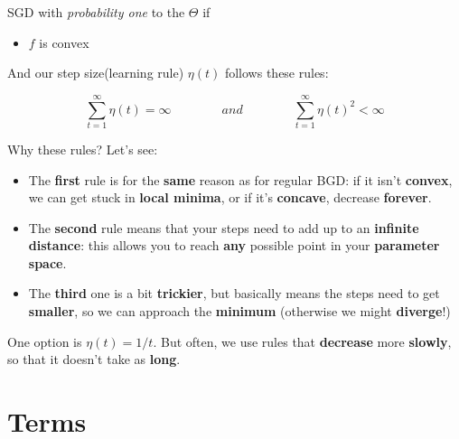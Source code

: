         \begin{theorem}
            SGD  with \textit{probability one} to the  $\Theta$ if
            
            \begin{itemize}
                \item $f$ is convex
            \end{itemize}
            
            And our step size(learning rule) $\eta(t)$ follows these rules:
            
            \begin{equation*}
                \sum_{t=1}^{\infty} \eta(t) = \infty
                \qquad \qquad
                and
                \qquad \qquad
                \sum_{t=1}^{\infty} \eta(t)^2 < \infty
            \end{equation*}
        \end{theorem}
        
        Why these rules? Let's see:
        
        \begin{itemize}
            \item The \textbf{first} rule is for the \textbf{same} reason as for regular BGD: if it isn't \textbf{convex}, we can get stuck in \textbf{local minima}, or if it's \textbf{concave}, decrease \textbf{forever}.
            
            \item The \textbf{second} rule means that your steps need to add up to an \textbf{infinite distance}: this allows you to reach \textbf{any} possible point in your \textbf{parameter space}.
            
            \item The \textbf{third} one is a bit \textbf{trickier}, but basically means the steps need to get \textbf{smaller}, so we can approach the \textbf{minimum} (otherwise we might \textbf{diverge}!)
        \end{itemize}
        
        One option is $\eta(t)=1/t$. But often, we use rules that \textbf{decrease} more \textbf{slowly}, so that it doesn't take as \textbf{long}.

\section{Terms}
    

